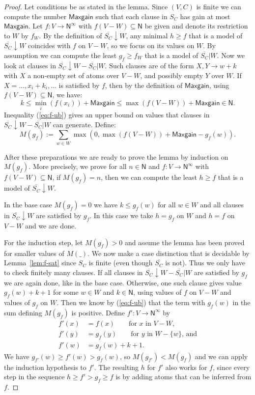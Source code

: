 \documentclass[11pt,a4paper]{article}
\newcommand{\N}{\mathsf{N}}
\newcommand\set[1]{\{#1\}}
\newcommand\Ninf{\N^\infty}
\newcommand\M{\mathsf{Maxgain}}
\newcommand\upS[1]{\overline{S_{#1}}}
\newcommand{\FYI}[1]{{\color{red}#1}}
\begin{document}
\begin{proof}
Let conditions be as stated in the lemma.
\FYI{Since $(V,C)$ is finite we can compute the number
$\M$ such that each clause in $S_C$ has gain at most $\M$.}
Let $f: V\to\Ninf$ with $f(V-W)\subseteq \N$ be given
and denote its restriction to $W$ by $f_W$.
By the definition of $\upS{C}{\downarrow}W$, any minimal $h\geq f$
that is a model of $\upS{C}{\downarrow}W$
coincides with $f$ on $V-W$, so we focus on its values on $W$.
By assumption we can compute the least $g_f \geq f_W$ that 
is a model of $\upS{C}|W$.
Now we look at clauses in $\upS{C}{\downarrow}W - \upS{C}|W$. 
Such clauses are of the form $X,Y \to w+k$ with $X$ a non-empty
set of atoms over $V-W$, and possibly empty $Y$ over $W$. 
If $X = \ldots,x_i+k_i,\ldots$ is satisfied by $f$, 
then by the definition of $\M$, using $f(V-W)\subseteq \N$,
we have:
\begin{equation}\label{eq:f-ub}
k \leq\min_i(f(x_i)) + \M \leq \max(f(V-W)) + \M \in \N.
\end{equation}
\FYI{Inequality (\ref{eq:f-ub}) gives an upper bound on values that clauses 
in $\upS{C}{\downarrow}W - \upS{C}|W$ can generate.} Define:
\[
M(g_f) := \sum_{w \in W}  \max(0, \max(f(V-W)) + \M - g_f(w)).
\] 

\FYI{After these preparations we are ready to prove the lemma
by induction on $M(g_f)$. More precisely, we prove for all $n\in\N$
and $f: V\to\Ninf$ with $f(V-W)\subseteq \N$, if $M(g_f)=n$,
then we can compute
the least $h \geq f$ that is a model of $\upS{C}{\downarrow}W$.}

In the base case $M(g_f)=0$ we have $k\leq g_f(w)$ for all $w\in W$
and all clauses in $\upS{C}{\downarrow}W$ are satisfied by $g_f$.
In this case we take $h=g_f$ on $W$ and $h=f$ on $V-W$ and we are done.

For the induction step, let $M(g_f)>0$ and assume
the lemma has been proved for smaller values of $M(\_)$.
We now make a case distinction that is decidable
by Lemma~\ref{lem:f-sat} since
$S_C$ is finite (even though $\upS{C}$ is not).
Thus we only have to check finitely many clauses.
If all clauses in $\upS{C}{\downarrow}W - \upS{C}|W$ are satisfied 
by $g_f$ we are again done, like in the base case.
Otherwise, one such clause gives value $g_f(w)+k+1$ for some $w\in W$ 
and $k\in\N$, using values of $f$ on $V-W$ and values of $g_f$ on $W$. 
Then we know by (\ref{eq:f-ub}) that the term with $g_f(w)$
in the sum defining $M(g_f)$ is positive.
Define $f' : V \to \Ninf$ by 
\begin{align*}
f'(x)&= f(x)   \quad\quad\text{for $x$ in $V-W$,}\\ 
f'(y)&= g_f(y) \quad\quad\text{for $y$ in $W-\set{w}$, and}\\ 
f'(w)&= g_f(w)+k+1. 
\end{align*}
We have $g_{f'}(w) \geq f'(w) > g_f(w)$, so $M(g_{f'}) < M(g_f)$
and we can apply the induction hypothesis to $f'$.
The resulting $h$ for $f'$ also works for $f$,
since every step in the sequence 
$h \geq f' > g_f \geq f$
is by adding atoms that can be inferred from $f$.
\end{proof}
\end{document}
